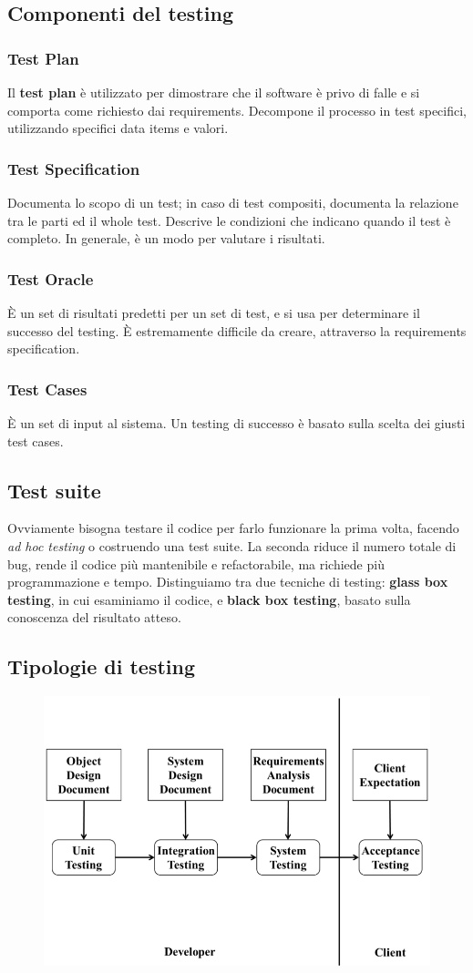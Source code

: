 \documentclass[11pt]{article}
\begin{document}
\subsection{Componenti del testing}
\subsubsection{Test Plan}
Il \textbf{test plan} è utilizzato per dimostrare che il software è privo di falle e si comporta come richiesto dai requirements. Decompone il processo in test specifici, utilizzando specifici data items e valori. 
\subsubsection{Test Specification}
Documenta lo scopo di un test; in caso di test compositi, documenta la relazione tra le parti ed il whole test. Descrive le condizioni che indicano quando il test è completo. In generale, è un modo per valutare i risultati. 
\subsubsection{Test Oracle}
È un set di risultati predetti per un set di test, e si usa per determinare il successo del testing. È estremamente difficile da creare, attraverso la requirements specification. 
\subsubsection{Test Cases}
È un set di input al sistema. Un testing di successo è basato sulla scelta dei giusti test cases.

\subsection{Test suite}
Ovviamente bisogna testare il codice per farlo funzionare la prima volta, facendo \textit{ad hoc testing} o costruendo una test suite. La seconda riduce il numero totale di bug, rende il codice più mantenibile e refactorabile, ma richiede più programmazione e tempo. Distinguiamo tra due tecniche di testing: \textbf{glass box testing}, in cui esaminiamo il codice, e \textbf{black box testing}, basato sulla conoscenza del risultato atteso. 
\subsection{Tipologie di testing}
\begin{figure}[H]
    \includegraphics[width=0.7\linewidth]{res/teoria/TestingTypes.png}
\end{figure}
\end{document}
